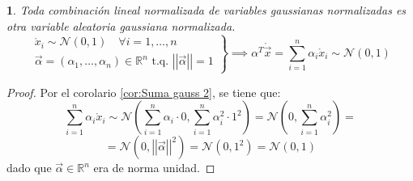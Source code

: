 \documentclass[11pt,a4paper,spanish]{article}
\numberwithin{equation}{section}
\numberwithin{table}{section}
\numberwithin{figure}{section}
\theoremstyle{definition}
\theoremstyle{remark}
\theoremstyle{definition}
\theoremstyle{remark}
\theoremstyle{plain}
\theoremstyle{plain}
\theoremstyle{plain}
\newtheorem{cor}{\protect\corollaryname}[section]
\theoremstyle{plain}
\theoremstyle{plain}
\theoremstyle{plain}
\providecommand{\corollaryname}{Corolario}
\begin{document}
	\begin{cor}
		\label{cor:combinaci=0000F3n lineal gaussianas normalizadas}Toda
		combinación lineal normalizada de variables gaussianas normalizadas
		es otra variable aleatoria gaussiana normalizada.
		\[
		\left.\begin{matrix}\mathring{x}_{i}\sim\mathcal{N}\left(0,1\right)\quad\forall i=1,\dots,n\\
			\vec{\alpha}=\left(\alpha_{1},\dots,\alpha_{n}\right)\in\mathbb{R}^{n}\text{ t.q. }\left|\left|\vec{\alpha}\right|\right|=1
		\end{matrix}\right\} \implies\alpha^{T}\mathring{\vec{x}}=\sum_{i=1}^{n}\alpha_{i}\mathring{x}_{i}\sim\mathcal{N}\left(0,1\right)
		\]
	\end{cor}
	\begin{proof}
		Por el corolario \vref{cor:Suma gauss 2}, se tiene que:
		\[
		\sum_{i=1}^{n}\alpha_{i}\mathring{x}_{i}\sim\mathcal{N}\left(\sum_{i=1}^{n}\alpha_{i}\cdot0,\sum_{i=1}^{n}\alpha_{i}^{2}\cdot1^{2}\right)=\mathcal{N}\left(0,\sum_{i=1}^{n}\alpha_{i}^{2}\right)=
		\]
		\[
		=\mathcal{N}\left(0,\left|\left|\vec{\alpha}\right|\right|^{2}\right)=\mathcal{N}\left(0,1^{2}\right)=\mathcal{N}\left(0,1\right)
		\]
		dado que $\vec{\alpha}\in\mathbb{R}^{n}$ era de norma unidad.
	\end{proof}
	
\end{document}
